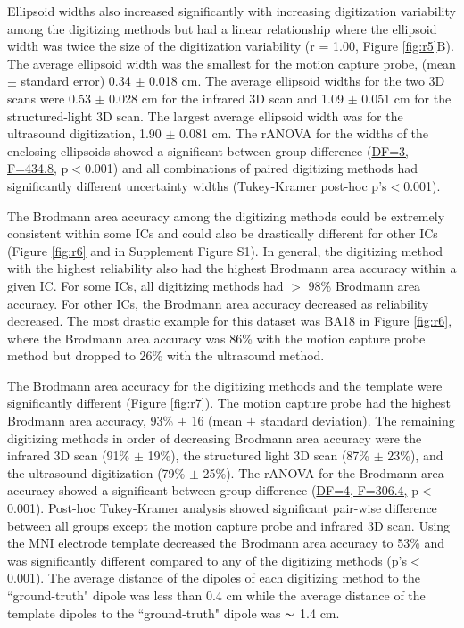 \documentclass[../thesis_seyed.tex]{subfiles}
\begin{document}
Ellipsoid widths also increased significantly with increasing digitization variability among the digitizing methods but had a linear relationship where the ellipsoid width was twice the size of the digitization variability (r = 1.00, Figure \ref{fig:r5}B). The average ellipsoid width was the smallest for the motion capture probe, (mean $\pm$ standard error) 0.34 $\pm$ 0.018 cm. The average ellipsoid widths for the two 3D scans were 0.53 $\pm$ 0.028 cm for the infrared 3D scan and 1.09 $\pm$ 0.051 cm for the structured-light 3D scan. The largest average ellipsoid width was for the ultrasound digitization, 1.90 $\pm$ 0.081 cm. The rANOVA for the widths of the enclosing ellipsoids showed a significant between-group difference (\ul{DF=3, F=434.8}, p$<$0.001) and all combinations of paired digitizing methods had significantly different uncertainty widths (Tukey-Kramer post-hoc p's$<$0.001).

The Brodmann area accuracy among the digitizing methods could be extremely consistent within some ICs and could also be drastically different for other ICs (Figure \ref{fig:r6} and in Supplement Figure S1). In general, the digitizing method with the highest reliability also had the highest Brodmann area accuracy within a given IC. For some ICs, all digitizing methods had $>$ 98\% Brodmann area accuracy. For other ICs, the Brodmann area accuracy decreased as reliability decreased. The most drastic example for this dataset was BA18 in Figure \ref{fig:r6}, where the Brodmann area accuracy was 86\% with the motion capture probe method but dropped to 26\% with the ultrasound method.

The Brodmann area accuracy for the digitizing methods and the template were significantly different (Figure \ref{fig:r7}). The motion capture probe had the highest Brodmann area accuracy, 93\% $\pm$ 16 (mean $\pm$ standard deviation). The remaining digitizing methods in order of decreasing Brodmann area accuracy were the infrared 3D scan (91\% $\pm$ 19\%), the structured light 3D scan (87\% $\pm$ 23\%), and the ultrasound digitization (79\% $\pm$ 25\%). The rANOVA for the Brodmann area accuracy showed a significant between-group difference (\ul{DF=4, F=306.4,} p$<$0.001). Post-hoc Tukey-Kramer analysis showed significant pair-wise difference between all groups except the motion capture probe and infrared 3D scan. Using the MNI electrode template decreased the Brodmann area accuracy to 53\% and was significantly different compared to any of the digitizing methods (p's$<$0.001). The average distance of the dipoles of each digitizing method to the ``ground-truth" dipole was less than 0.4 cm while the average distance of the template dipoles to the ``ground-truth" dipole was $\thicksim$ 1.4 cm. 
\end{document}
